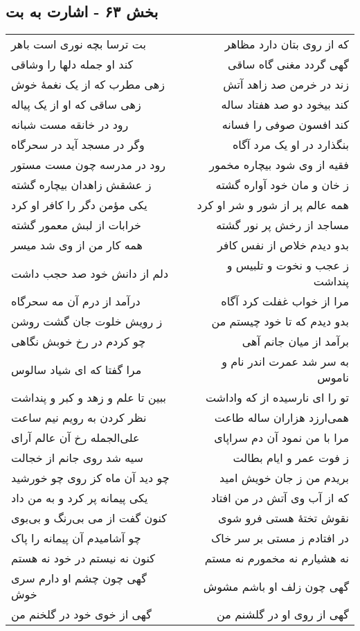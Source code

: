 \begin{center}
\section*{بخش ۶۳ - اشارت به بت}
\label{sec:sh063}
\begin{longtable}{l p{0.5cm} r}
بت ترسا بچه نوری است باهر
&&
که از روی بتان دارد مظاهر
\\
کند او جمله دلها را وشاقی
&&
گهی گردد مغنی گاه ساقی
\\
زهی مطرب که از یک نغمهٔ خوش
&&
زند در خرمن صد زاهد آتش
\\
زهی ساقی که او از یک پیاله
&&
کند بیخود دو صد هفتاد ساله
\\
رود در خانقه مست شبانه
&&
کند افسون صوفی را فسانه
\\
وگر در مسجد آید در سحرگاه
&&
بنگذارد در او یک مرد آگاه
\\
رود در مدرسه چون مست مستور
&&
فقیه از وی شود بیچاره مخمور
\\
ز عشقش زاهدان بیچاره گشته
&&
ز خان و مان خود آواره گشته
\\
یکی مؤمن دگر را کافر او کرد
&&
همه عالم پر از شور و شر او کرد
\\
خرابات از لبش معمور گشته
&&
مساجد از رخش پر نور گشته
\\
همه کار من از وی شد میسر
&&
بدو دیدم خلاص از نفس کافر
\\
دلم از دانش خود صد حجب داشت
&&
ز عجب و نخوت و تلبیس و پنداشت
\\
درآمد از درم آن مه سحرگاه
&&
مرا از خواب غفلت کرد آگاه
\\
ز رویش خلوت جان گشت روشن
&&
بدو دیدم که تا خود چیستم من
\\
چو کردم در رخ خوبش نگاهی
&&
برآمد از میان جانم آهی
\\
مرا گفتا که ای شیاد سالوس
&&
به سر شد عمرت اندر نام و ناموس
\\
ببین تا علم و زهد و کبر و پنداشت
&&
تو را ای نارسیده از که واداشت
\\
نظر کردن به رویم نیم ساعت
&&
همی‌ارزد هزاران ساله طاعت
\\
علی‌الجمله رخ آن عالم آرای
&&
مرا با من نمود آن دم سراپای
\\
سیه شد روی جانم از خجالت
&&
ز فوت عمر و ایام بطالت
\\
چو دید آن ماه کز روی چو خورشید
&&
بریدم من ز جان خویش امید
\\
یکی پیمانه پر کرد و به من داد
&&
که از آب وی آتش در من افتاد
\\
کنون گفت از می بی‌رنگ و بی‌بوی
&&
نقوش تختهٔ هستی فرو شوی
\\
چو آشامیدم آن پیمانه را پاک
&&
در افتادم ز مستی بر سر خاک
\\
کنون نه نیستم در خود نه هستم
&&
نه هشیارم نه مخمورم نه مستم
\\
گهی چون چشم او دارم سری خوش
&&
گهی چون زلف او باشم مشوش
\\
گهی از خوی خود در گلخنم من
&&
گهی از روی او در گلشنم من
\\
\end{longtable}
\end{center}

